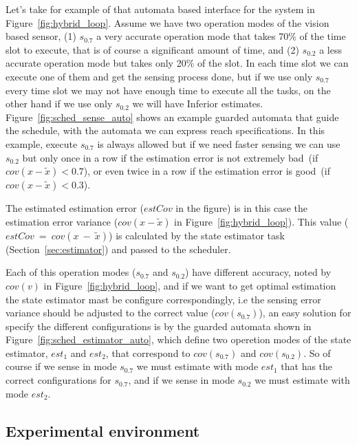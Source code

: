 \documentclass[11pt]{article}
\begin{document}
Let's take for example of that automata based interface for the system in Figure~\ref{fig:hybrid_loop}.
Assume we have two operation modes of the vision based sensor, (1) $s_{0.7}$ a very accurate operation mode that takes 70\% of the time slot to execute, that is of course a significant amount of time, and (2) $s_{0.2}$ a less accurate operation mode but takes only 20\% of the slot.
In each time slot we can execute one of them and get the sensing process done, but if we use only $s_{0.7}$ every time slot we may not have enough time to execute all the tasks, on the other hand if we use only $s_{0.2}$ we will have Inferior estimates.
Figure~\ref{fig:sched_sense_auto} shows an example guarded automata that guide the schedule, with the automata we can express reach specifications. 
In this example, execute $s_{0.7}$ is always allowed but if we need faster sensing we can use $s_{0.2}$ but only once in a row if the estimation error is not extremely bad~(if~$cov(x-\tilde{x}) < 0.7$), or even twice in a row if the estimation error is good~(if~$cov(x-\tilde{x}) < 0.3$).

The estimated estimation error ($estCov$ in the figure) is in this case the estimation error variance ($cov(x-\tilde{x})$ in Figure~\ref{fig:hybrid_loop}). 
This value ($estCov~=~cov(x~-~\tilde{x})$) is calculated by the state estimator task (Section~\ref{sec:estimator}) and passed to the scheduler.

Each of this operation modes ($s_{0.7}$ and $s_{0.2}$) have different accuracy, noted by $cov(v)$ in Figure~\ref{fig:hybrid_loop}, and if we want to get optimal estimation the state estimator mast be configure correspondingly, i.e the sensing error variance should be adjusted to the correct value ($cov(s_{0.7})$), an easy solution for specify the different configurations is by the guarded automata shown in Figure~\ref{fig:sched_estimator_auto}, which define two operetion modes of the state estimator, $est_1$ and $est_2$, that correspond to $cov(s_{0.7})$ and $cov(s_{0.2})$. So of course if we sense in mode $s_{0.7}$ we must estimate with mode $est_1$ that has the correct configurations for $s_{0.7}$, and if we sense in mode $s_{0.2}$ we must estimate with mode $est_2$.



\subsection{Experimental environment}
\label{sec:enviroment}
\end{document}
